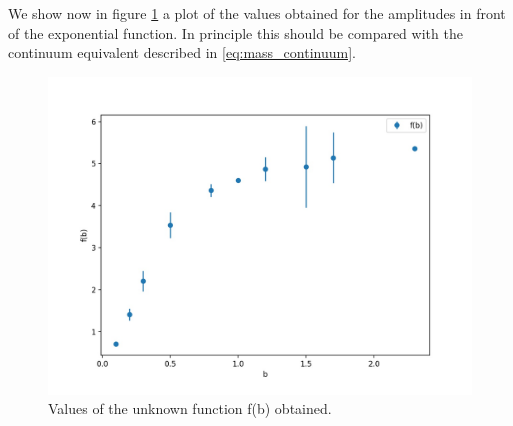 \documentclass[12pt,a4paper]{report}
\begin{document}
 We show now in figure \ref{fig:f_b} a plot of the values obtained for the amplitudes in front of the exponential function. In principle this should be compared with the continuum equivalent described in \eqref{eq:mass_continuum}.
\begin{figure}
\centering
\includegraphics[width=1.0\textwidth]{f_b_corr}
\caption{Values of the unknown function f(b) obtained.}
\label{fig:f_b}
\end{figure} 
\end{document}
